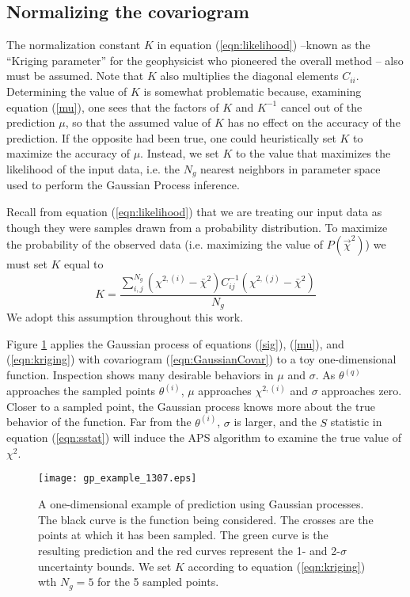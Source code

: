 \documentclass[useAMS,usenatbib]{aastex}
\newcommand{\APS}{APS }
\begin{document}
\subsection{Normalizing the covariogram}
\label{sec:kriging}

The normalization constant $K$ in equation (\ref{eqn:likelihood}) --known as the
``Kriging parameter'' for the geophysicist who pioneered the overall method -- 
also
must be assumed.  Note that $K$ also multiplies the diagonal elements
$C_{ii}$.  Determining the value of $K$ 
is somewhat problematic because, examining equation
(\ref{mu}), one sees that the factors of $K$ and $K^{-1}$
cancel out of
the prediction $\mu$, so that the assumed value of $K$ has no effect on the accuracy
of the prediction.  
If the opposite had been true, one could heuristically set $K$ to
maximize the accuracy of $\mu$.  
Instead, we set $K$ to the value that maximizes the likelihood
of the input data, i.e. the $N_g$ nearest neighbors in parameter space
used to perform the Gaussian Process inference.

Recall from equation (\ref{eqn:likelihood}) that we are treating our
input data as though they were samples drawn from a probability distribution.
To maximize the probability of the observed data (i.e. maximizing the value
of $P(\vec{\chi}^2)$) we must set $K$ equal to
\begin{equation}
\label{eqn:kriging}
K=\frac{\sum_{i,j}^{N_g}(\chi^{2,(i)}-\bar{\chi}^2)
C^{-1}_{ij}(\chi^{2,(j)}-\bar{\chi}^2)}
{N_g}
\end{equation}
We adopt this assumption throughout this work.

Figure \ref{fig:gp} applies the Gaussian process of equations (\ref{sig}), 
(\ref{mu}), and (\ref{eqn:kriging}) with covariogram (\ref{eqn:GaussianCovar})
to a toy one-dimensional function.  Inspection shows many desirable
behaviors in $\mu$ and $\sigma$.  
As $\theta^{(q)}$ approaches the sampled points $\theta^{(i)}$, $\mu$
approaches $\chi^{2,(i)}$ and $\sigma$ approaches zero.  
Closer to a sampled point,
the Gaussian process knows more about the true behavior of the function. 
Far from the $\theta^{(i)}$, $\sigma$ is larger, and the $S$ statistic in
equation (\ref{eqn:sstat}) will induce the \APS
algorithm to examine the true value of $\chi^2$.

\begin{figure}
\texttt{[image: gp\_example\_1307.eps]}
\caption{
A one-dimensional example of prediction using Gaussian processes.  
The black curve is the function
being considered.  The crosses are the points at which it has been sampled.  The
green curve is the resulting prediction and the red curves represent the 
1- and
2-$\sigma$ uncertainty bounds.  We set $K$ according to 
equation (\ref{eqn:kriging}) wth $N_g=5$ for the 5 sampled points.
}
\label{fig:gp}
\end{figure}
\end{document}
